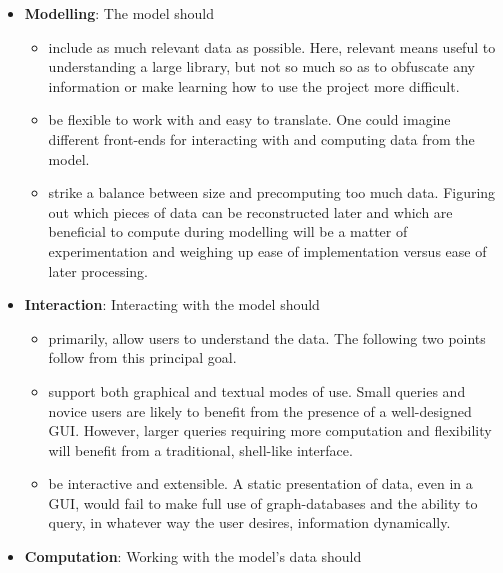 \begin{itemize}

  \item \textbf{Modelling}: The model should
  \begin{itemize}

    \item include as much relevant data as possible. Here, relevant means
          useful to understanding a large library, but not so much so as to
          obfuscate any information or make learning how to use the project
          more difficult.

    \item be flexible to work with and easy to translate. One could imagine
          different front-ends for interacting with and computing data
          from the model.

    \item strike a balance between size and precomputing too much data.
          Figuring out which pieces of data can be reconstructed later and
          which are beneficial to compute during modelling will be a matter of
          experimentation and weighing up ease of implementation
          versus ease of later processing.

  \end{itemize}

  \item \textbf{Interaction}: Interacting with the model should
  \begin{itemize}

    \item primarily, allow users to understand the data. The following two points
          follow from this principal goal.

    \item support both graphical and textual modes of use. Small queries and
          novice users are likely to benefit from the presence of a well-designed
          GUI. However, larger queries requiring more computation and
          flexibility will benefit from a traditional, shell-like interface.

    \item be interactive and extensible. A static presentation of data, even in
          a GUI, would fail to make full use of graph-databases and the ability
          to query, in whatever way the user desires, information dynamically.

  \end{itemize}

  \item \textbf {Computation}: Working with the model's data should
  \begin{itemize}


\end{itemize}
\end{itemize}
